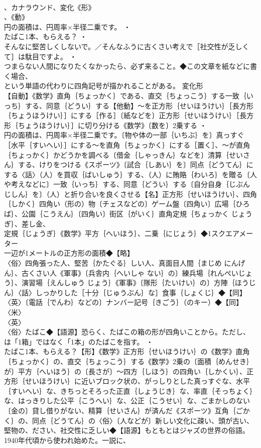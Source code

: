 \documentclass[8pt]{extreport}
\begin{document}
\begin{CJK}{UTF8}{min}
\\	、カナラウンド、変化《形》
\\	、《動》
\\	円の面積は、円周率×半径二乗です。 ・
\\	たばこ1本、もらえる？ ・
\\	そんなに堅苦しくしないで。／そんなふうに古くさい考えで［社交性が乏しくて］は駄目ですよ。 ・
\\	つまらない人間になりたくなかったら、必ず来ること。◆この文章を紙などに書く場合、
\\	という単語の代わりに四角記号が描かれることがある。	変化形 
\\	【自動】《数学》直角｛ちょっかく｝である、直交｛ちょっこう｝する一致｛いっち｝する、同意｛どうい｝する【他動】～を正方形｛せいほうけい｝［長方形｛ちょうほうけい｝］にする［作る］〔紙などを〕正方形｛せいほうけい｝［長方形｛ちょうほうけい｝］に切り分ける《数学》〔数を〕2乗する ・
\\	円の面積は、円周率×半径二乗です。〔物や体の一部｛いちぶ｝を〕真っすぐ［水平｛すいへい｝］にする～を直角｛ちょっかく｝にする［置く］、～が直角｛ちょっかく｝かどうかを調べる〔借金｛しゃっきん｝などを〕清算｛せいさん｝する、けりをつける《スポーツ》〔試合｛しあい｝を〕同点｛どうてん｝にする〈話〉（人）を買収｛ばいしゅう｝する、（人）に賄賂｛わいろ｝を贈る〔人や考えなどに〕一致｛いっち｝する、同意｛どうい｝する〔自分自身｛じぶん じしん｝を〕（人）と折り合いを良くさせる【名】正方形｛せいほうけい｝、四角｛しかく｝四角い（形の）物〔チェスなどの〕ゲーム盤〔四角い〕広場｛ひろば｝、公園｛こうえん｝〔四角い〕街区｛がいく｝直角定規｛ちょっかく じょうぎ｝、差し金、
\\	定規｛じょうぎ｝《数学》平方｛へいほう｝、二乗｛にじょう｝◆1スクエアメーター 
\\	一辺が1メートルの正方形の面積◆【略】
\\	〈俗〉四角張った人、堅苦｛かたぐる｝しい人、真面目人間｛まじめ にんげん｝、古くさい人《軍事》〔兵舎内｛へいしゃ ない｝の〕練兵場｛れんぺいじょう｝、演習場｛えんしゅう じょう｝《軍事》〔隊形｛たいけい｝の〕方陣｛ほうじん｝〈話〉しっかりした［十分｛じゅうぶん｝な］食事｛しょくじ｝◆【同】
\\	〈英〉〔電話｛でんわ｝などの〕ナンバー記号｛きごう｝（のキー）◆【同】〈米〉
\\	〈英〉
\\	〈俗〉たばこ◆【語源】恐らく、たばこの箱の形が四角いことから。ただし、
\\	は「1箱」ではなく「1本」のたばこを指す。 ・
\\	たばこ1本、もらえる？【形】《数学》正方形｛せいほうけい｝の《数学》直角｛ちょっかく｝の、直交｛ちょっこう｝する《数学》2乗の〔面積｛めんせき｝が〕平方｛へいほう｝の〔長さが〕～四方｛しほう｝の四角い｛しかくい｝、正方形｛せいほうけい｝に近いブロック状の、がっしりとした真っすぐな、水平｛すいへい｝な、きちっとそろった正直｛しょうじき｝な、率直｛そっちょく｝な、はっきりした公平｛こうへい｝な、公正｛こうせい｝な、ごまかしのない〔金の〕貸し借りがない、精算｛せいさん｝が済んだ《スポーツ》互角｛ごかく｝の、同点｛どうてん｝の〈俗〉〔人などが〕新しい文化に疎い、頭が古い、堅物の、ださい、社交性に乏しい◆【語源】もともとはジャズの世界の俗語。1940年代頃から使われ始めた。一説に、

\end{CJK}
\end{document}
